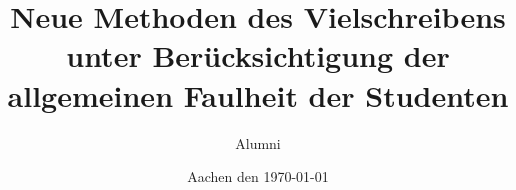 %
\titlehead{Institut für Germanistische und\\
Allgemeine Literaturwissenschaft\\
 der RWTH Aachen}
\subject{Diplomarbeit}
\title{Neue Methoden des Vielschreibens unter
Berücksichtigung der allgemeinen Faulheit der Studenten}
\author{Alumni}
\date{Aachen den \today} %
\publishers{betreut durch Prof. Schreibnix}
\maketitle